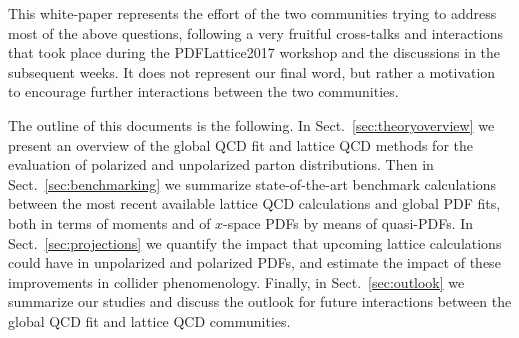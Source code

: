 This white-paper represents the effort of the two communities trying to address most
of the above questions, following a very fruitful cross-talks and interactions that took
place during the PDFLattice2017 workshop and the discussions in the subsequent weeks.
%
It does not represent our final word, but rather a motivation to encourage further
interactions between the two communities.

The outline of this documents is the following.
%
In Sect.~\ref{sec:theoryoverview} we present an overview of
the global QCD fit and lattice QCD methods for the evaluation
of polarized and unpolarized parton distributions.
%
Then in Sect.~\ref{sec:benchmarking}
we summarize  state-of-the-art benchmark
calculations between the most
recent available lattice QCD calculations and global PDF fits,
both in terms of moments and of $x$-space PDFs by means of
quasi-PDFs.
%
In Sect.~\ref{sec:projections} we quantify the impact that
upcoming lattice calculations could have in unpolarized
and polarized PDFs, and estimate the impact of these improvements
in collider phenomenology.
%
Finally, in Sect.~\ref{sec:outlook} we summarize our studies
and discuss the outlook for future interactions between
the global QCD fit and lattice QCD communities.
